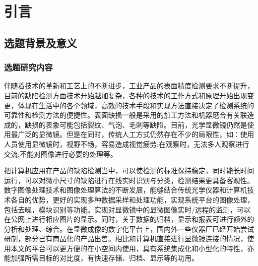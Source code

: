 {\tiny {\tiny }}\chapter{引言}
\section{选题背景及意义}
\subsection{选题研究内容}
伴随着技术的革新和工艺上的不断进步，工业产品的表面精度检测要求不断提升，目前的缺陷检测方面技术开始越加复杂，各种的技术的工作方式和原理开始出现变更，体现在生活中的各个领域，高效的技术手段和实现方法直接决定了检测系统的可靠性和检测方法的便捷性。表面缺损一般是采用的加工方法和机器磨合有关联造成的，缺损的表象可能包括裂纹、气泡、毛刺等缺陷。目前，光学显微镜仍然是使用最广泛的显微镜。但是在同时，传统人工方式仍然存在不少的局限性，如：使用人员使用显微镜时，视野不畅，容易造成视觉疲劳;在观察时，无法多人观察进行交流;不能对图像进行必要的处理等。


把计算机应用在产品的缺陷检测当中，可以使检测的标准保持稳定，同时能长时间运行，可以对微小尺寸的缺陷进行在线实时识别与分类，检测结果更具备客观性。数字图像处理技术和图像处理算法的不断发展，能够结合传统光学仪器和计算机技术各自的优势，更好的实现多种数据采样和处理功能，实现系统平台的图像处理，包括去噪，模块识别等功能\cite{machine}。实现对显微镜中的显微图像实时/远程的监测，可以在公网上进行相应图片的显示。同时，关于数据的归档，显示和报表可进行额外的分析和处理、综合。在显微成像的数字化平台上，国内外一些仪器厂已经开始尝试研制，部分已有商品化的产品出售\cite{light3D}\cite{eletnature}。相比和计算机直接进行显微镜连接的情况，使用本文的平台可以更方便的在小空间内使用，具有系统集成化和小型化的特性，亦能加强所需目标的对比度，有快速存储、归档、显示等的功用。


